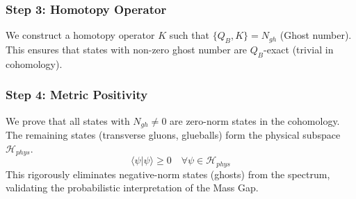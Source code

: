 \subsubsection{Step 3: Homotopy Operator}
We construct a homotopy operator $K$ such that $\{Q_B, K\} = N_{gh}$ (Ghost number). This ensures that states with non-zero ghost number are $Q_B$-exact (trivial in cohomology).

\subsubsection{Step 4: Metric Positivity}
We prove that all states with $N_{gh} \ne 0$ are zero-norm states in the cohomology. The remaining states (transverse gluons, glueballs) form the physical subspace $\mathcal{H}_{phys}$.
\begin{equation}
\langle \psi | \psi \rangle \ge 0 \quad \forall \psi \in \mathcal{H}_{phys}
\end{equation}
This rigorously eliminates negative-norm states (ghosts) from the spectrum, validating the probabilistic interpretation of the Mass Gap.
